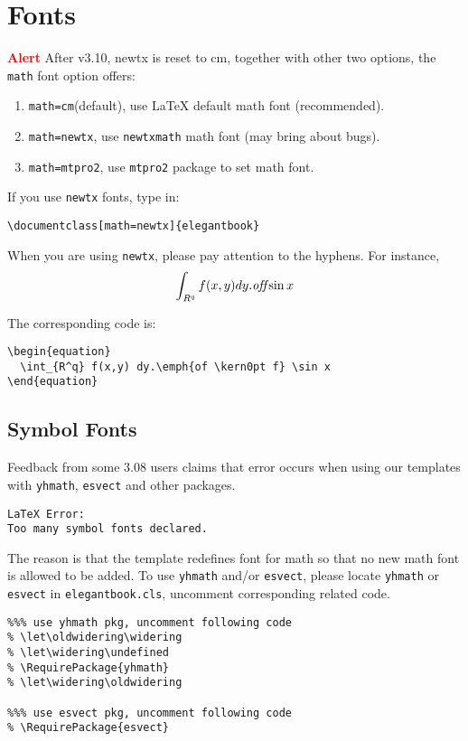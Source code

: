 \documentclass[11pt]{elegantbook}
\begin{document}
\section{Fonts}
\textcolor{red}{\bfseries Alert} After v3.10, newtx is reset to cm, together with other two options, the \lstinline{math} font option offers:
\begin{enumerate}
  \item \lstinline{math=cm}(default), use \LaTeX{} default math font (recommended).
  \item \lstinline{math=newtx}, use \lstinline{newtxmath} math font (may bring about bugs).
  \item \lstinline{math=mtpro2}, use \lstinline{mtpro2} package to set math font.
\end{enumerate}

If you use \lstinline{newtx} fonts, type in:
\begin{lstlisting}
\documentclass[math=newtx]{elegantbook}
\end{lstlisting}

When you are using \lstinline{newtx}, please pay attention to the hyphens. For instance,
\begin{equation}
\int_{R^q} f(x,y) dy.\emph{of\kern0pt f} \sin x
\end{equation}

The corresponding code is: 
\begin{lstlisting}
\begin{equation}
  \int_{R^q} f(x,y) dy.\emph{of \kern0pt f} \sin x
\end{equation}
\end{lstlisting}

\subsection{Symbol Fonts}
Feedback from some 3.08 users claims that error occurs when using our templates with  \lstinline{yhmath}, \lstinline{esvect} and other packages.
\begin{lstlisting}
LaTeX Error:
Too many symbol fonts declared.
\end{lstlisting}

The reason is that the template redefines font for math so that no new math font is allowed to be added. To use \lstinline{yhmath} and/or \lstinline{esvect}, please locate \lstinline{yhmath} or \lstinline{esvect} in \lstinline{elegantbook.cls}, uncomment corresponding related code.

\begin{lstlisting}
%%% use yhmath pkg, uncomment following code
% \let\oldwidering\widering
% \let\widering\undefined
% \RequirePackage{yhmath}
% \let\widering\oldwidering

%%% use esvect pkg, uncomment following code
% \RequirePackage{esvect}
\end{lstlisting}
\end{document}
